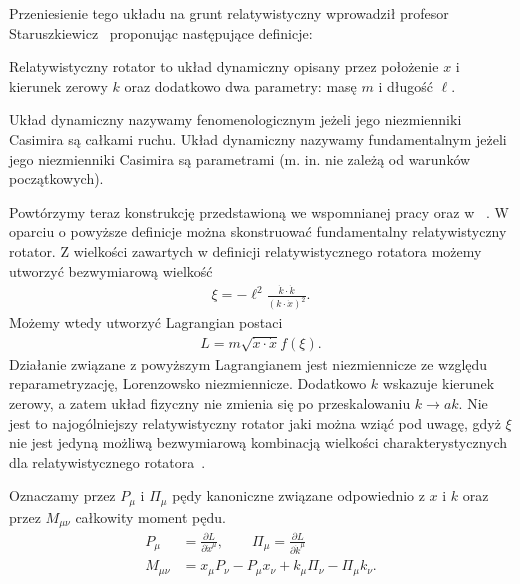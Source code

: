 Przeniesienie tego układu na grunt relatywistyczny wprowadził 
profesor Staruszkiewicz~\cite{star2008} proponując następujące 
definicje:
\begin{definition}
Relatywistyczny rotator to układ dynamiczny
 opisany przez położenie $x$ i kierunek
zerowy $k$ oraz dodatkowo dwa parametry: masę $m$ i długość $\ell$.
\end{definition}
\begin{definition}
Układ dynamiczny  nazywamy fenomenologicznym jeżeli jego niezmienniki Casimira są 
całkami ruchu. Układ dynamiczny nazywamy fundamentalnym jeżeli jego niezmienniki
Casimira są parametrami (m. in. nie zależą od warunków początkowych).
\end{definition}
Powtórzymy teraz konstrukcję przedstawioną we wspomnianej pracy oraz w
~\cite{Kassandrov2009, Bratek2009nonuniq}.
W oparciu o powyższe definicje można skonstruować fundamentalny
relatywistyczny rotator. Z wielkości zawartych w definicji relatywistycznego 
rotatora możemy utworzyć bezwymiarową wielkość
\begin{align*}
\xi = - \ell^2 \frac{\dot{k} \cdot \dot{k}}{ ( k \cdot \dot{x})^2 }.
\end{align*}
Możemy wtedy utworzyć Lagrangian postaci
\begin{align}\label{rotatorStar}
L = m \sqrt{ \dot{x} \cdot \dot{x} } f( \xi ) .
\end{align}
Działanie związane z powyższym Lagrangianem 
jest niezmiennicze ze względu reparametryzację, 
Lorenzowsko niezmiennicze. Dodatkowo $k$ wskazuje kierunek zerowy, a zatem
 układ fizyczny nie zmienia się
po przeskalowaniu $k \to a k$. 
Nie jest to najogólniejszy relatywistyczny 
rotator jaki można wziąć pod uwagę, gdyż $\xi$ nie jest jedyną 
możliwą bezwymiarową kombinacją wielkości charakterystycznych 
dla relatywistycznego rotatora~\cite{Bratek2009nonuniq}.


Oznaczamy przez $P_\mu$ i $\Pi_\mu$ pędy kanoniczne związane 
odpowiednio z $x$ i $k$ oraz przez $M_{\mu\nu}$ całkowity moment pędu.
\begin{align*}
P_\mu &= \frac{\partial L}{\partial \dot{x}^\mu}, \qquad
\Pi_\mu = \frac{\partial L}{\partial \dot{k}^\mu} \\
M_{\mu\nu} &= x_\mu P_\nu - P_\mu x_\nu + k_\mu \Pi_\nu - \Pi_\mu k_\nu.
\end{align*}

